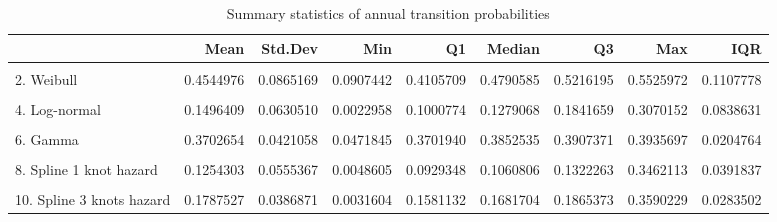 \documentclass[]{article}
\begin{document}
\begin{table}
\caption{\label{tab:validate_extrapolation3}Summary statistics of annual transition probabilities}
\begin{tabular}[t]{lrrrrrrrr}
\toprule
  & Mean & Std.Dev & Min & Q1 & Median & Q3 & Max & IQR\\
\midrule
\cellcolor{gray!6}{1. Exponential} & \cellcolor{gray!6}{0.2449482} & \cellcolor{gray!6}{0.0000000} & \cellcolor{gray!6}{0.2449482} & \cellcolor{gray!6}{0.2449482} & \cellcolor{gray!6}{0.2449482} & \cellcolor{gray!6}{0.2449482} & \cellcolor{gray!6}{0.2449482} & \cellcolor{gray!6}{0.0000000}\\
2. Weibull & 0.4544976 & 0.0865169 & 0.0907442 & 0.4105709 & 0.4790585 & 0.5216195 & 0.5525972 & 0.1107778\\
\cellcolor{gray!6}{3. Gompertz} & \cellcolor{gray!6}{0.5870906} & \cellcolor{gray!6}{0.2349728} & \cellcolor{gray!6}{0.2169796} & \cellcolor{gray!6}{0.3698466} & \cellcolor{gray!6}{0.5818235} & \cellcolor{gray!6}{0.8071868} & \cellcolor{gray!6}{1.0000000} & \cellcolor{gray!6}{0.4373402}\\
4. Log-normal & 0.1496409 & 0.0630510 & 0.0022958 & 0.1000774 & 0.1279068 & 0.1841659 & 0.3070152 & 0.0838631\\
\cellcolor{gray!6}{5. Log-logistic} & \cellcolor{gray!6}{0.1158111} & \cellcolor{gray!6}{0.0780753} & \cellcolor{gray!6}{0.0305143} & \cellcolor{gray!6}{0.0571627} & \cellcolor{gray!6}{0.0832145} & \cellcolor{gray!6}{0.1494462} & \cellcolor{gray!6}{0.3207417} & \cellcolor{gray!6}{0.0920005}\\
6. Gamma & 0.3702654 & 0.0421058 & 0.0471845 & 0.3701940 & 0.3852535 & 0.3907371 & 0.3935697 & 0.0204764\\
\cellcolor{gray!6}{7. Generalised Gamma} & \cellcolor{gray!6}{0.1013639} & \cellcolor{gray!6}{0.0706160} & \cellcolor{gray!6}{0.0000317} & \cellcolor{gray!6}{0.0518395} & \cellcolor{gray!6}{0.0728961} & \cellcolor{gray!6}{0.1237607} & \cellcolor{gray!6}{0.3222943} & \cellcolor{gray!6}{0.0717062}\\
8. Spline 1 knot hazard & 0.1254303 & 0.0555367 & 0.0048605 & 0.0929348 & 0.1060806 & 0.1322263 & 0.3462113 & 0.0391837\\
\cellcolor{gray!6}{9. Spline 2 knots hazard} & \cellcolor{gray!6}{0.1469155} & \cellcolor{gray!6}{0.0485978} & \cellcolor{gray!6}{0.0027621} & \cellcolor{gray!6}{0.1183362} & \cellcolor{gray!6}{0.1309295} & \cellcolor{gray!6}{0.1552006} & \cellcolor{gray!6}{0.3471134} & \cellcolor{gray!6}{0.0367658}\\
10. Spline 3 knots hazard & 0.1787527 & 0.0386871 & 0.0031604 & 0.1581132 & 0.1681704 & 0.1865373 & 0.3590229 & 0.0283502\\

\end{tabular}
\end{table}
\end{document}
